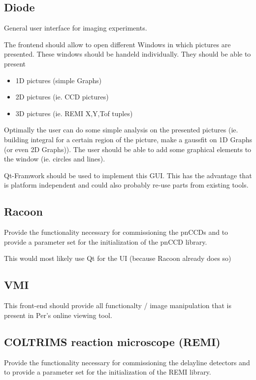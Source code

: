 \documentclass[11pt,a4paper,oneside]{article}
\begin{document}
\subsection{Diode}
\label{sec:diode}

General user interface for imaging experiments.

The frontend should allow to open different Windows in which pictures are presented. These windows should be handeld individually. They should be able to present 
\begin{itemize}
	\item 1D pictures (simple Graphs)
	\item 2D pictures (ie. CCD pictures)
	\item 3D pictures (ie. REMI X,Y,Tof tuples)
\end{itemize}
Optimally the user can do some simple analysis on the presented pictures (ie. building integral for a certain region of the picture, make a gaussfit on 1D Graphs (or even 2D Graphs)). The user should be able to add some graphical elements to the window (ie. circles and lines).

Qt-Framwork should be used to implement this GUI. This has the advantage that is platform independent and could also probably re-use parts from existing tools.

\subsection{Racoon}
\label{sec:racoon}

Provide the functionality necessary for commissioning the pnCCDs and to provide a parameter set for the initialization of the pnCCD library.

This would most likely use Qt for the UI (because Racoon already does so)


\subsection{VMI}
\label{sec:vmi-frontend}

This front-end should provide all functionalty / image manipulation that is present in Per's online viewing tool.

\subsection{COLTRIMS reaction microscope (REMI)}
\label{sec:remi-frontend}

Provide the functionality necessary for commissioning the delayline detectors and to provide a parameter set for the initialization of the REMI library.
\end{document}

